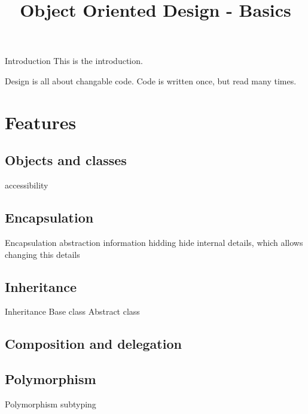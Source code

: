 

\title{Object Oriented Design - Basics}



\begin{frame}
\titlepage
\end{frame}

\begin{frame}{Introduction}
This is the introduction.
\end{frame}


\begin{frame}
Design is all about changable code.
Code is written once, but read many times.
\end{frame}

\section{Features}

\begin{frame}
\subsection{Objects and classes}
accessibility
\end{frame}

\subsection{Encapsulation}
\begin{frame}{Encapsulation}
abstraction
information hidding
hide internal details, which allows changing this details
\end{frame}

\subsection{Inheritance}
\begin{frame}{Inheritance}
Base class
Abstract class
\end{frame}

\subsection{Composition and delegation}
\subsection{Polymorphism}
\begin{frame}{Polymorphism}
subtyping
\end{frame}

